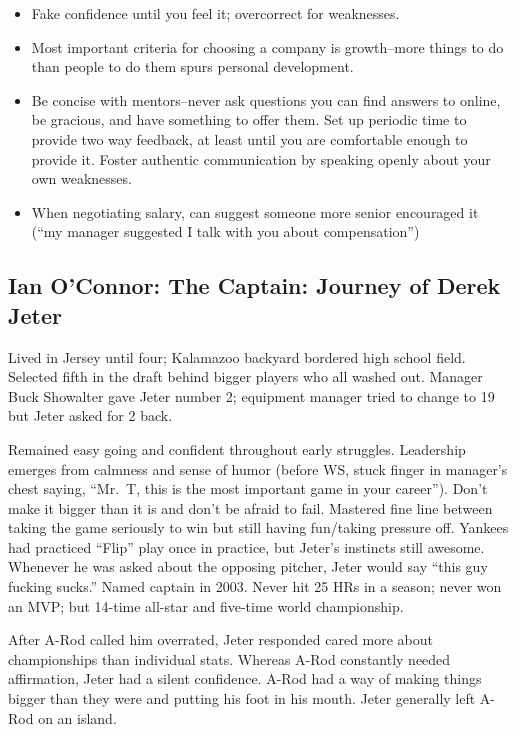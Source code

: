 \documentclass[
]{article}
\begin{document}
\begin{itemize}
\item
  Fake confidence until you feel it; overcorrect for weaknesses.
\item
  Most important criteria for choosing a company is growth--more things
  to do than people to do them spurs personal development.
\item
  Be concise with mentors--never ask questions you can find answers to
  online, be gracious, and have something to offer them. Set up periodic
  time to provide two way feedback, at least until you are comfortable
  enough to provide it. Foster authentic communication by speaking
  openly about your own weaknesses.
\item
  When negotiating salary, can suggest someone more senior encouraged it
  (``my manager suggested I talk with you about compensation'')
\end{itemize}

\hypertarget{ian-oconnor-the-captain-journey-of-derek-jeter}{%
\subsection{Ian O'Connor: The Captain: Journey of Derek
Jeter}\label{ian-oconnor-the-captain-journey-of-derek-jeter}}

Lived in Jersey until four; Kalamazoo backyard bordered high school
field. Selected fifth in the draft behind bigger players who all washed
out. Manager Buck Showalter gave Jeter number 2; equipment manager tried
to change to 19 but Jeter asked for 2 back.

Remained easy going and confident throughout early struggles. Leadership
emerges from calmness and sense of humor (before WS, stuck finger in
manager's chest saying, ``Mr.~T, this is the most important game in your
career''). Don't make it bigger than it is and don't be afraid to fail.
Mastered fine line between taking the game seriously to win but still
having fun/taking pressure off. Yankees had practiced ``Flip'' play once
in practice, but Jeter's instincts still awesome. Whenever he was asked
about the opposing pitcher, Jeter would say ``this guy fucking sucks.''
Named captain in 2003. Never hit 25 HRs in a season; never won an MVP;
but 14-time all-star and five-time world championship.

After A-Rod called him overrated, Jeter responded cared more about
championships than individual stats. Whereas A-Rod constantly needed
affirmation, Jeter had a silent confidence. A-Rod had a way of making
things bigger than they were and putting his foot in his mouth. Jeter
generally left A-Rod on an island.
\end{document}
